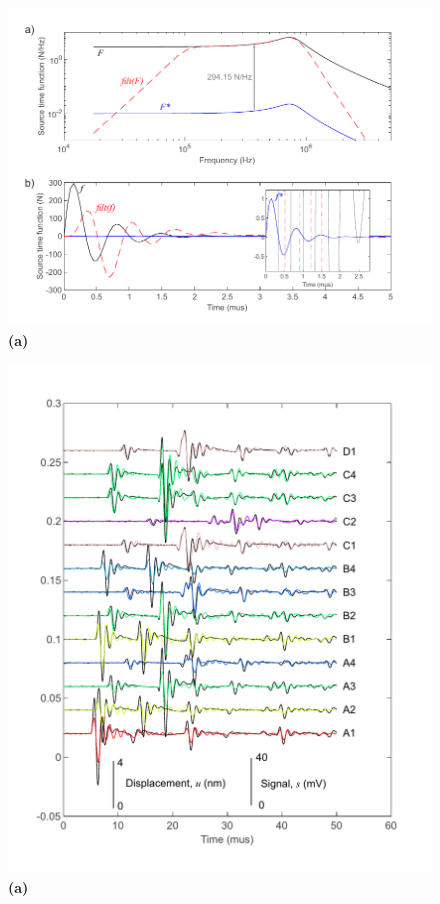 \documentclass[preprint,3p, 11pt,authoryear]{elsarticle}
\begin{document}
{\begin{figure}[ht]
     	\centering
\includegraphics[scale= 1]{FIG9.pdf} 
\caption{\textbf{(a)}  }
	\label{fig9} 
\end{figure}

\begin{figure}[ht]
     	\centering
\includegraphics[scale= 1]{FIG10.pdf} 
\caption{\textbf{(a)}  }
	\label{fig10} 
\end{figure}




}
\end{document}
